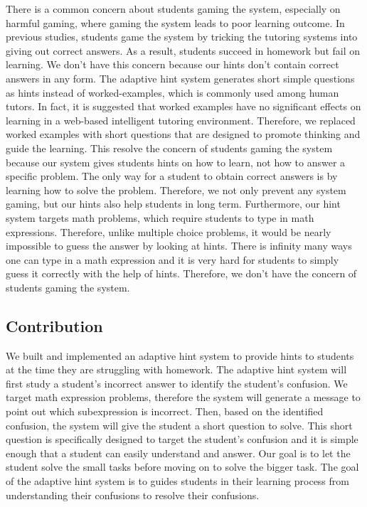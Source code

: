\documentclass{llncs}
\begin{document}
There is a common concern about students gaming the system, especially on harmful gaming, where gaming the system leads to poor learning outcome\cite{Baker2004}\cite{Baker2005}. In previous studies, students game the system by tricking the tutoring systems into giving out correct answers\cite{Baker2004Off-task}. As a result, students succeed in homework but fail on learning. We don't have this concern because our hints don't contain correct answers in any form. The adaptive hint system generates short simple questions as hints instead of worked-examples, which is commonly used among human tutors\cite{Atkinson2000}. In fact, it is suggested that worked examples have no significant effects on learning in a web-based intelligent tutoring environment\cite{McLaren2006}. Therefore, we replaced worked examples with short questions that are designed to promote thinking and guide the learning. This resolve the concern of students gaming the system because our system gives students hints on how to learn, not how to answer a specific problem. The only way for a student to obtain correct answers is by learning how to solve the problem. Therefore, we not only prevent any system gaming, but our hints also help students in long term. Furthermore, our hint system targets math problems, which require students to type in math expressions. Therefore, unlike multiple choice problems, it would be nearly impossible to guess the answer by looking at hints. There is infinity many ways one can type in a math expression and it is very hard for students to simply guess it correctly with the help of hints. Therefore, we don't have the concern of students gaming the system.

\subsection*{Contribution}
We built and implemented an adaptive hint system to provide hints to students at the time they are struggling with homework. The adaptive hint system will first study a student's incorrect answer to identify the student's confusion. We target math expression problems, therefore the system will generate a message to point out which subexpression is incorrect. Then, based on the identified confusion, the system will give the student a short question to solve. This short question is specifically designed to target the student's confusion and it is simple enough that a student can easily understand and answer. Our goal is to let the student solve the small tasks before moving on to solve the bigger task. The goal of the adaptive hint system is to guides students in their learning process from understanding their confusions to resolve their confusions.
\end{document}
